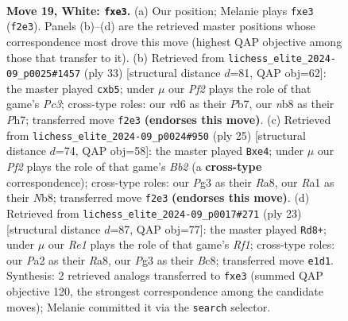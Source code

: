 \documentclass[11pt]{article}
\begin{document}
\clearpage

\begin{figure}[p]\centering
\begin{subfigure}{0.46\textwidth}\centering
\resizebox{\linewidth}{!}{%
\newchessgame
\chessboard[
  setfen={rnb3k1/1p2bpp1/pn1rp3/7p/8/1Pp1p1P1/P3PPBP/RNB1RK2 w - - 0 19},
  showmover=false,
  pgfstyle=straightmove, color=movearrow, markmove={f2-e3}
]}
\caption{}
\end{subfigure}\hfill
\begin{subfigure}{0.46\textwidth}\centering
\resizebox{\linewidth}{!}{%
\newchessgame
\chessboard[
  setfen={r1b2rk1/pp4bp/2p3p1/1P3p2/2n5/P1N3P1/4PPBP/R2RB1K1 b - - 1 17},
  showmover=false,
  pgfstyle=straightmove, color=movearrow, markmove={c6-b5}
]}
\caption{}
\end{subfigure}
\\[4pt]
\begin{subfigure}{0.46\textwidth}\centering
\resizebox{\linewidth}{!}{%
\newchessgame
\chessboard[
  setfen={rn2r1k1/pbp2ppp/1p1p1b2/P7/4N3/6PP/1PP1PPB1/RNB2RK1 b - - 0 13},
  showmover=false,
  pgfstyle=straightmove, color=movearrow, markmove={b7-e4}
]}
\caption{}
\end{subfigure}\hfill
\begin{subfigure}{0.46\textwidth}\centering
\resizebox{\linewidth}{!}{%
\newchessgame
\chessboard[
  setfen={r1b2rk1/pp2ppbp/n1P3p1/8/4B3/5N1P/PPP2PP1/R1BK3R b - - 0 12},
  showmover=false,
  pgfstyle=straightmove, color=movearrow, markmove={f8-d8}
]}
\caption{}
\end{subfigure}
\caption{\textbf{Move 19, White: \texttt{fxe3}.} (a) Our position; Melanie plays \texttt{fxe3} (\texttt{f2e3}). Panels (b)--(d) are the retrieved master positions whose correspondence most drove this move (highest QAP objective among those that transfer to it). (b) Retrieved from \texttt{lichess\_elite\_2024-09\_p0025\#1457} (ply 33) [structural distance $d$=81, QAP obj=62]: the master played \texttt{cxb5}; under $\mu$ our \emph{Pf2} plays the role of that game's \emph{Pc3}; cross-type roles: our \emph{r}d6 as their \emph{P}b7, our \emph{n}b8 as their \emph{P}h7; transferred move \texttt{f2e3} \textbf{(endorses this move)}. (c) Retrieved from \texttt{lichess\_elite\_2024-09\_p0024\#950} (ply 25) [structural distance $d$=74, QAP obj=58]: the master played \texttt{Bxe4}; under $\mu$ our \emph{Pf2} plays the role of that game's \emph{Bb2} (a \textbf{cross-type} correspondence); cross-type roles: our \emph{P}g3 as their \emph{R}a8, our \emph{R}a1 as their \emph{N}b8; transferred move \texttt{f2e3} \textbf{(endorses this move)}. (d) Retrieved from \texttt{lichess\_elite\_2024-09\_p0017\#271} (ply 23) [structural distance $d$=87, QAP obj=77]: the master played \texttt{Rd8+}; under $\mu$ our \emph{Re1} plays the role of that game's \emph{Rf1}; cross-type roles: our \emph{P}a2 as their \emph{R}a8, our \emph{P}g3 as their \emph{B}c8; transferred move \texttt{e1d1}. Synthesis: 2 retrieved analogs transferred to \texttt{fxe3} (summed QAP objective 120, the strongest correspondence among the candidate moves); Melanie committed it via the \texttt{search} selector.}
\label{fig:thought-m36}
\end{figure}
\end{document}
